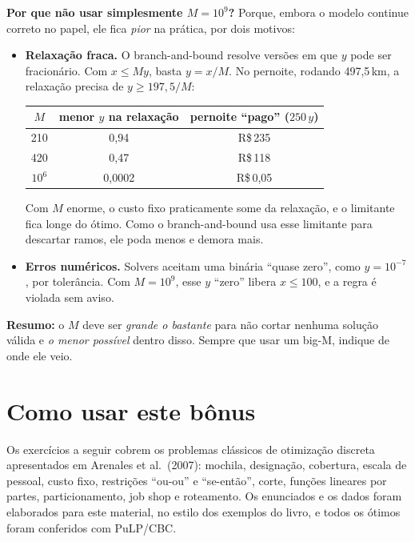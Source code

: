 \documentclass[11pt,a4paper]{article}
\begin{document}
\textbf{Por que não usar simplesmente $M=10^9$?} Porque, embora o modelo continue correto no papel, ele fica
\emph{pior} na prática, por dois motivos:
\begin{itemize}
  \item \textbf{Relaxação fraca.} O branch-and-bound resolve versões em que $y$ pode ser fracionário. Com $x\le My$,
        basta $y=x/M$. No pernoite, rodando 497,5\,km, a relaxação precisa de $y\ge197{,}5/M$:
        \begin{center}
        \begin{tabular}{ccc}
        \toprule
        $M$ & menor $y$ na relaxação & pernoite ``pago'' ($250\,y$)\\
        \midrule
        210 & 0,94 & R\$\,235\\
        420 & 0,47 & R\$\,118\\
        $10^6$ & 0,0002 & R\$\,0,05\\
        \bottomrule
        \end{tabular}
        \end{center}
        Com $M$ enorme, o custo fixo praticamente some da relaxação, e o limitante fica longe do ótimo. Como o
        branch-and-bound usa esse limitante para descartar ramos, ele poda menos e demora mais.
  \item \textbf{Erros numéricos.} Solvers aceitam uma binária ``quase zero'', como $y=10^{-7}$, por tolerância. Com
        $M=10^9$, esse $y$ ``zero'' libera $x\le100$, e a regra é violada sem aviso.
\end{itemize}
\textbf{Resumo:} o $M$ deve ser \emph{grande o bastante} para não cortar nenhuma solução válida e \emph{o menor possível}
dentro disso. Sempre que usar um big-M, indique de onde ele veio.

\clearpage
\section*{Como usar este bônus}

Os exercícios a seguir cobrem os problemas clássicos de otimização discreta apresentados em Arenales et al.\ (2007):
mochila, designação, cobertura, escala de pessoal, custo fixo, restrições ``ou-ou'' e ``se-então'', corte, funções
lineares por partes, particionamento, job shop e roteamento. Os enunciados e os dados foram elaborados para este
material, no estilo dos exemplos do livro, e todos os ótimos foram conferidos com PuLP/CBC.
\end{document}

